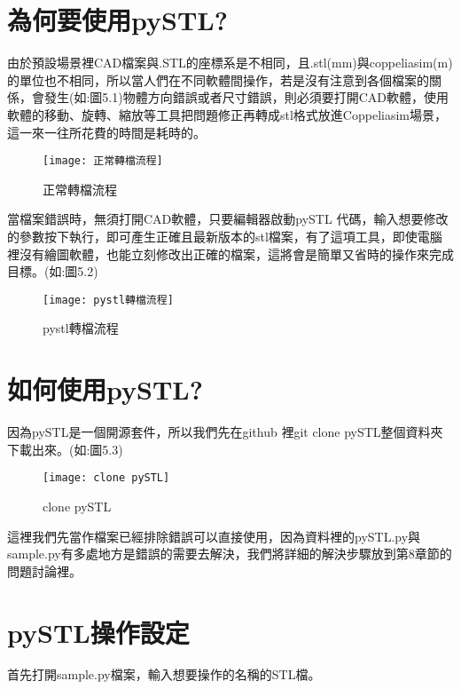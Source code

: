 \section{為何要使用pySTL?}

由於預設場景裡CAD檔案與.STL的座標系是不相同，且.stl(mm)與coppeliasim(m) 的單位也不相同，所以當人們在不同軟體間操作，若是沒有注意到各個檔案的關係，會發生(如:圖5.1)物體方向錯誤或者尺寸錯誤，則必須要打開CAD軟體，使用軟體的移動、旋轉、縮放等工具把問題修正再轉成stl格式放進Coppeliasim場景，這一來一往所花費的時間是耗時的。\\

\begin{figure}[hbt!]
\begin{center}
\texttt{[image: 正常轉檔流程]}
\caption{\Large 正常轉檔流程}\label{正常轉檔流程}
\end{center}
\end{figure}

當檔案錯誤時，無須打開CAD軟體，只要編輯器啟動pySTL 代碼，輸入想要修改的參數按下執行，即可產生正確且最新版本的stl檔案，有了這項工具，即使電腦裡沒有繪圖軟體，也能立刻修改出正確的檔案，這將會是簡單又省時的操作來完成目標。(如:圖5.2)\\

\begin{figure}[hbt!]
\begin{center}
\texttt{[image: pystl轉檔流程]}
\caption{\Large pystl轉檔流程}\label{pystl轉檔流程}
\end{center}
\end{figure}

\section{如何使用pySTL?}
因為pySTL是一個開源套件，所以我們先在github 裡git clone pySTL整個資料夾下載出來。(如:圖5.3)
\begin{figure}[hbt!]
\begin{center}
\texttt{[image: clone pySTL]}
\caption{\Large clone pySTL}\label{clone pySTL}
\end{center}
\end{figure}

這裡我們先當作檔案已經排除錯誤可以直接使用，因為資料裡的pySTL.py與sample.py有多處地方是錯誤的需要去解決，我們將詳細的解決步驟放到第8章節的問題討論裡。\\

\section{ pySTL操作設定}
首先打開sample.py檔案，輸入想要操作的名稱的STL檔。\\

